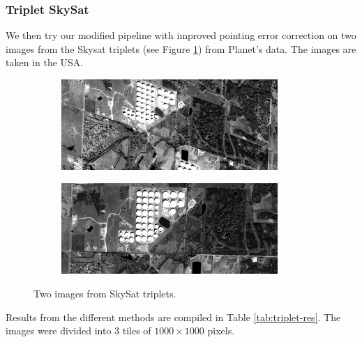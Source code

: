 \documentclass[paper=a4, fontsize=11pt, onecolumn, tikz, dvipsnames, svgnames, x11names]{article}
\begin{document}
\subsubsection{Triplet SkySat}
             We then try our modified pipeline with improved pointing error correction on two images from the Skysat triplets (see Figure \ref{fig:triplet}) from Planet's data. The images are taken in the USA. %

            \begin{figure}[H]
            \centering
            \begin{subfigure}[b]{0.6\linewidth}
              \centering\includegraphics[width=0.9\textwidth]{figures/triplet_0.jpeg}
            \end{subfigure}%

            \begin{subfigure}[b]{0.6\linewidth}
              \centering\includegraphics[width=0.9\textwidth]{figures/triplet_1.jpeg}
            \end{subfigure}
 \caption{Two images from SkySat triplets.}
           \label{fig:triplet}
          \end{figure}


    Results from the different methods are compiled in Table \ref{tab:triplet-res}. The images were divided into $3$ tiles of $1000 \times 1000$ pixels.
\end{document}
